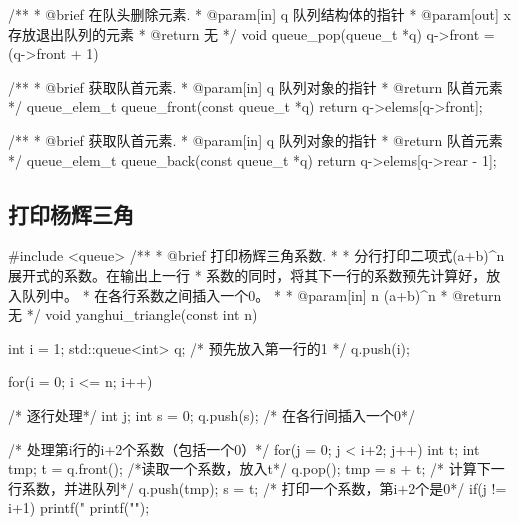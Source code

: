\begin{Codex}[label=queue.c]
/**
  * @brief 在队头删除元素.
  * @param[in] q 队列结构体的指针
  * @param[out] x 存放退出队列的元素
  * @return 无
  */
void queue_pop(queue_t *q) {
    q->front = (q->front + 1) %
}

/**
 * @brief 获取队首元素.
 * @param[in] q 队列对象的指针
 * @return 队首元素
 */
queue_elem_t queue_front(const queue_t *q) {
    return q->elems[q->front];
}

/**
 * @brief 获取队首元素.
 * @param[in] q 队列对象的指针
 * @return 队首元素
 */
queue_elem_t queue_back(const queue_t *q) {
    return q->elems[q->rear - 1];
}
\end{Codex}

\subsection{打印杨辉三角}

\begin{Codex}[label=yanghui_triangle.cpp]
#include <queue>
/**
 * @brief 打印杨辉三角系数.
 *
 * 分行打印二项式(a+b)^n展开式的系数。在输出上一行
 * 系数的同时，将其下一行的系数预先计算好，放入队列中。
 * 在各行系数之间插入一个0。
 *
 * @param[in] n (a+b)^n
 * @return 无
 */
void yanghui_triangle(const int n) {
    int i = 1;
    std::queue<int> q;
    /* 预先放入第一行的1 */
    q.push(i);

    for(i = 0; i <= n; i++) {     /* 逐行处理*/
        int j;
        int s = 0;
        q.push(s);      /* 在各行间插入一个0*/

        /* 处理第i行的i+2个系数（包括一个0）*/
        for(j = 0; j < i+2; j++) {
            int t;
            int tmp;
            t = q.front();  /*读取一个系数，放入t*/
            q.pop();
            tmp = s + t;      /* 计算下一行系数，并进队列*/
            q.push(tmp);
            s = t;            /* 打印一个系数，第i+2个是0*/
            if(j != i+1) {
                printf("%
            }
        }
        printf("\n"); 
    }
}
\end{Codex}
